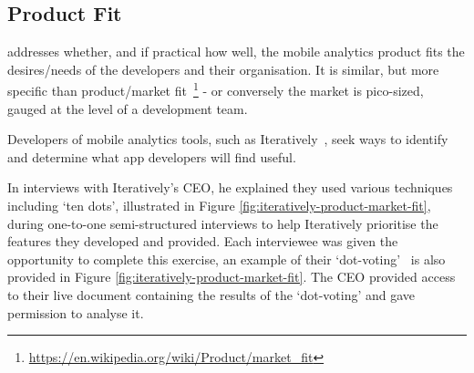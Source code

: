 \subsection{Product Fit}
 addresses whether, and if practical how well, the mobile analytics product fits the desires/needs of the developers and their organisation. It is similar, but more specific than product/market fit~\footnote{\url{https://en.wikipedia.org/wiki/Product/market_fit}} - or conversely the market is pico-sized, gauged at the level of a development team. %

Developers of mobile analytics tools, such as Iteratively~, seek ways to identify and determine what app developers will find useful. 

In interviews with Iteratively's CEO, he explained they used various techniques including `ten dots', illustrated in Figure \ref{fig:iteratively-product-market-fit}, during one-to-one semi-structured interviews to help Iteratively prioritise the features they developed and provided. Each interviewee was given the opportunity to complete this exercise, an example of their `dot-voting'~ is also provided in Figure \ref{fig:iteratively-product-market-fit}.
The CEO provided access to their live document containing the results of the `dot-voting' and gave permission to analyse it.~


